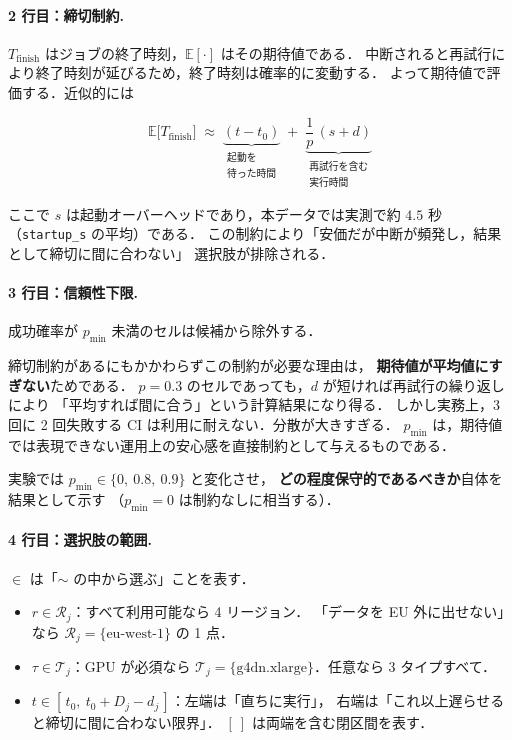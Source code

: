 \documentclass[11pt,a4paper]{ltjsarticle}
\newcommand{\Tfin}{T_{\mathrm{finish}}}
\newcommand{\E}{\mathbb{E}}
\begin{document}
\paragraph{2 行目：締切制約.}
$\Tfin$ はジョブの終了時刻，$\E[\cdot]$ はその期待値である．
中断されると再試行により終了時刻が延びるため，終了時刻は確率的に変動する．
よって期待値で評価する．近似的には

\begin{equation}
\E\bigl[\Tfin\bigr]
\;\approx\;
\underbrace{(t - t_0)}_{\substack{\text{起動を}\\\text{待った時間}}}
\;+\;
\underbrace{\frac{1}{p}\,(s + d)}_{\substack{\text{再試行を含む}\\\text{実行時間}}}
\label{eq:tfin}
\end{equation}

ここで $s$ は起動オーバーヘッドであり，本データでは実測で約 $4.5$ 秒
（\texttt{startup\_s} の平均）である．
この制約により「安価だが中断が頻発し，結果として締切に間に合わない」
選択肢が排除される．

\paragraph{3 行目：信頼性下限.}
成功確率が $p_{\min}$ 未満のセルは候補から除外する．

締切制約があるにもかかわらずこの制約が必要な理由は，
\textbf{期待値が平均値にすぎない}ためである．
$p=0.3$ のセルであっても，$d$ が短ければ再試行の繰り返しにより
「平均すれば間に合う」という計算結果になり得る．
しかし実務上，3 回に 2 回失敗する CI は利用に耐えない．分散が大きすぎる．
$p_{\min}$ は，期待値では表現できない運用上の安心感を直接制約として与えるものである．

実験では $p_{\min} \in \{0,\ 0.8,\ 0.9\}$ と変化させ，
\textbf{どの程度保守的であるべきか}自体を結果として示す
（$p_{\min}=0$ は制約なしに相当する）．

\paragraph{4 行目：選択肢の範囲.}
$\in$ は「$\sim$ の中から選ぶ」ことを表す．

\begin{itemize}
  \item $r \in \mathcal{R}_j$：すべて利用可能なら 4 リージョン．
        「データを EU 外に出せない」なら $\mathcal{R}_j = \{\text{eu-west-1}\}$ の 1 点．
  \item $\tau \in \mathcal{T}_j$：GPU が必須なら
        $\mathcal{T}_j = \{\text{g4dn.xlarge}\}$．任意なら 3 タイプすべて．
  \item $t \in [\,t_0,\ t_0+D_j-d_j\,]$：左端は「直ちに実行」，
        右端は「これ以上遅らせると締切に間に合わない限界」．
        $[\ ]$ は両端を含む閉区間を表す．
\end{itemize}
\end{document}
